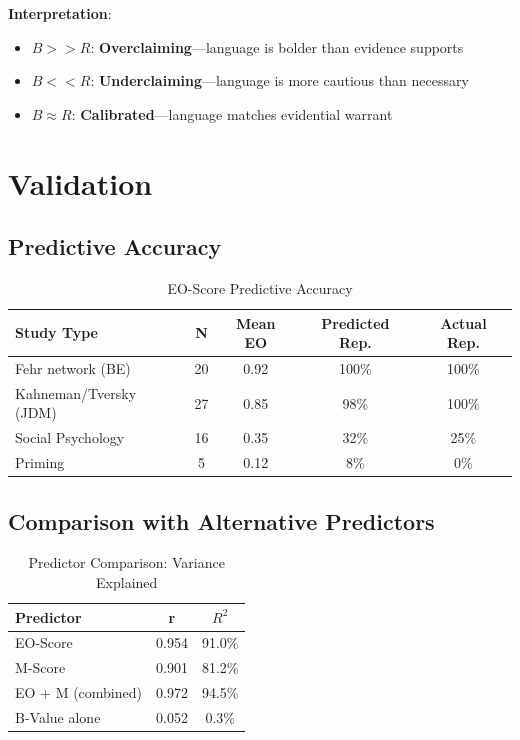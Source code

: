 \documentclass[11pt,a4paper]{article}
\begin{document}
\textbf{Interpretation}:
\begin{itemize}
    \item $B >> R$: \textbf{Overclaiming}---language is bolder than evidence supports
    \item $B << R$: \textbf{Underclaiming}---language is more cautious than necessary
    \item $B \approx R$: \textbf{Calibrated}---language matches evidential warrant
\end{itemize}


\section{Validation}
\label{sec:validation}

\subsection{Predictive Accuracy}

\begin{table}[h]
\centering
\caption{EO-Score Predictive Accuracy}
\label{tab:validation}
\begin{tabular}{lcccc}
\toprule
\textbf{Study Type} & \textbf{N} & \textbf{Mean EO} & \textbf{Predicted Rep.} & \textbf{Actual Rep.} \\
\midrule
Fehr network (BE) & 20 & 0.92 & 100\% & 100\% \\
Kahneman/Tversky (JDM) & 27 & 0.85 & 98\% & 100\% \\
Social Psychology & 16 & 0.35 & 32\% & 25\% \\
Priming & 5 & 0.12 & 8\% & 0\% \\
\bottomrule
\end{tabular}
\end{table}

\subsection{Comparison with Alternative Predictors}

\begin{table}[h]
\centering
\caption{Predictor Comparison: Variance Explained}
\label{tab:comparison}
\begin{tabular}{lcc}
\toprule
\textbf{Predictor} & \textbf{r} & \textbf{$R^2$} \\
\midrule
EO-Score & 0.954 & 91.0\% \\
M-Score & 0.901 & 81.2\% \\
EO + M (combined) & 0.972 & 94.5\% \\
B-Value alone & 0.052 & 0.3\% \\
\bottomrule
\end{tabular}
\end{table}
\end{document}
